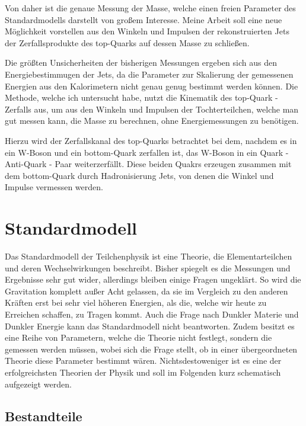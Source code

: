 \documentclass[
a4paper,                                %
twoside,                                %
BCOR1.4cm,                      %
ngerman,                                %
10pt,                           %
headings=normal,                %
headsepline,                    %
clearplainpage, %
final,                                  %
div=14,
parskip=full
]{scrbook}
\begin{document}
Von daher ist die genaue Messung der Masse, welche einen freien Parameter des Standardmodells darstellt von gro\ss em Interesse. Meine Arbeit soll eine neue M\"oglichkeit vorstellen aus den Winkeln und Impulsen der rekonstruierten Jets der Zerfallsprodukte des top-Quarks auf dessen Masse zu schlie\ss en. 

Die gr\"o\ss ten Unsicherheiten der bisherigen Messungen ergeben sich aus den Energiebestimmugen der Jets, da die Parameter zur Skalierung der gemessenen Energien aus den Kalorimetern nicht genau genug bestimmt werden k\"onnen. Die Methode, welche ich untersucht habe, nutzt die Kinematik des top-Quark - Zerfalls aus, um aus den Winkeln und Impulsen der Tochterteilchen, welche man gut messen kann, die Masse zu berechnen, ohne Energiemessungen zu ben\"otigen.

Hierzu wird der Zerfallskanal des top-Quarks betrachtet bei dem, nachdem es in ein W-Boson und ein bottom-Quark zerfallen ist, das W-Boson in ein Quark - Anti-Quark - Paar weiterzerf\"allt. Diese beiden Quakrs erzeugen zusammen mit dem bottom-Quark durch Hadronisierung Jets, von denen die Winkel und Impulse vermessen werden.

\newpage

\chapter{Standardmodell}

Das Standardmodell der Teilchenphysik ist eine Theorie, die Elementarteilchen und deren Wechselwirkungen beschreibt. Bisher spiegelt es die Messungen und Ergebnisse sehr gut wider, allerdings bleiben einige Fragen ungekl\"art. So wird die Gravitation komplett au\ss er Acht gelassen, da sie im Vergleich zu den anderen Kr\"aften erst bei sehr viel h\"oheren Energien, als die, welche wir heute zu Erreichen schaffen, zu Tragen kommt. Auch die Frage nach Dunkler Materie und Dunkler Energie kann das Standardmodell nicht beantworten. Zudem besitzt es eine Reihe von Parametern, welche die Theorie nicht festlegt, sondern die gemessen werden m\"ussen, wobei sich die Frage stellt, ob in einer \"ubergeordneten Theorie diese Parameter bestimmt w\"aren. Nichtsdestoweniger ist es eine der erfolgreichsten Theorien der Physik und soll im Folgenden kurz schematisch aufgezeigt werden.

\section{Bestandteile}
\end{document}
